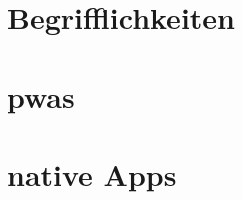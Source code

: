 \section{Begrifflichkeiten} \label{sec:2-begriffe}


\section{\acfp{pwa}} \label{sec:2-pwa}


\section{native Apps} \label{sec:2-nativ}
